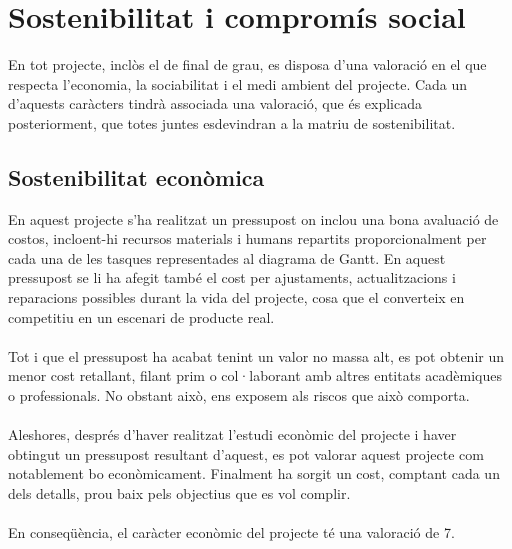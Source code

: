 
\chapter{Sostenibilitat i compromís social} %

\label{Chapter11} %

En tot projecte, inclòs el de final de grau, es disposa d’una valoració en el que respecta l’economia, la sociabilitat i el medi ambient del projecte. Cada un d’aquests caràcters tindrà associada una valoració, que és explicada posteriorment, que totes juntes esdevindran a la matriu de sostenibilitat\cite{impacto}.


\section{Sostenibilitat econòmica}

En aquest projecte s’ha realitzat un pressupost on inclou una bona avaluació de costos, incloent-hi recursos materials i humans repartits proporcionalment per cada una de les tasques representades al diagrama de Gantt. En aquest pressupost se li ha afegit també el cost per ajustaments, actualitzacions i reparacions possibles durant la vida del projecte, cosa que el converteix en competitiu en un escenari de producte real.
\\\\
Tot i que el pressupost ha acabat tenint un valor no massa alt, es pot obtenir un menor cost retallant, filant prim o col·laborant amb altres entitats acadèmiques o professionals. No obstant això, ens exposem als riscos que això comporta. 
\\\\
Aleshores, després d’haver realitzat l’estudi econòmic del projecte i haver obtingut un pressupost resultant d’aquest, es pot valorar aquest projecte com notablement bo econòmicament. Finalment ha sorgit un cost, comptant cada un dels detalls, prou baix pels objectius que es vol complir.
\\\\
En conseqüència, el caràcter econòmic del projecte té una valoració de 7.

